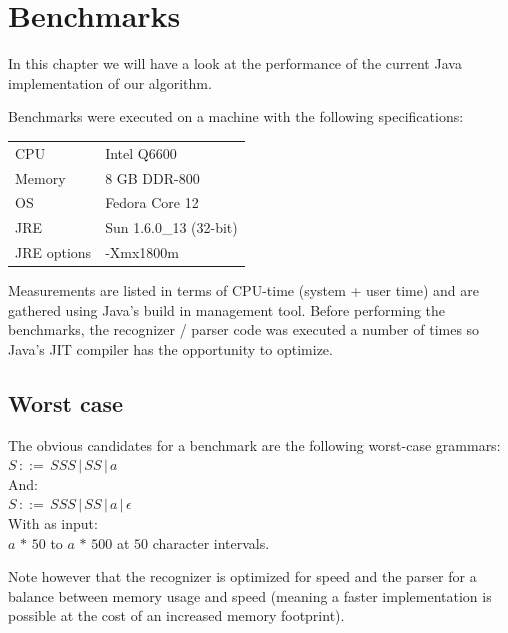 \documentclass[a4paper,10pt]{article}
\begin{document}
\section{Benchmarks}

In this chapter we will have a look at the performance of the current Java implementation of our algorithm.

Benchmarks were executed on a machine with the following specifications:
\begin{table}[H]
\centering
\begin{tabular}{ | p{6em} | p{9em} | }
 \hline
 CPU & Intel Q6600 \\
 Memory & 8 GB DDR-800 \\
 OS & Fedora Core 12 \\
 JRE & Sun 1.6.0\_13 (32-bit) \\
 JRE options & -Xmx1800m \\
 \hline
\end{tabular}
\end{table}

Measurements are listed in terms of CPU-time (system + user time) and are gathered using Java's build in management tool. Before performing the benchmarks, the recognizer / parser code was executed a number of times so Java's JIT compiler has the opportunity to optimize.

\pagebreak
\subsection{Worst case}
\label{sec:worstcaseBench}

The obvious candidates for a benchmark are the following worst-case grammars:
$S\,::=\,SSS\,|\,SS\,|\,a$\\
And:\\
$S\,::=\,SSS\,|\,SS\,|\,a\,|\,\epsilon$\\
With as input:\\
$a\,*\,50$ to $a\,*\,500$ at $50$ character intervals.

Note however that the recognizer is optimized for speed and the parser for a balance between memory usage and speed (meaning a faster implementation is possible at the cost of an increased memory footprint).
\end{document}
